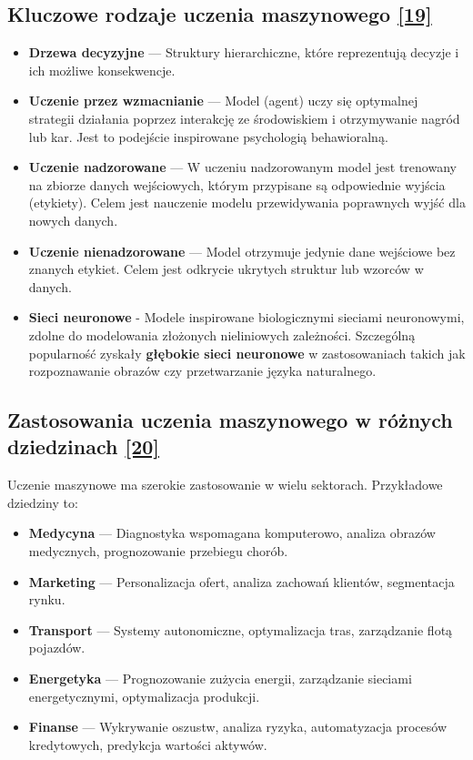 \documentclass[12pt,a4paper,twoside, inzynierska]{pwr_wmat_praca_dyplomowa}
\theoremstyle{plain}
\numberwithin{theorem}{chapter}
\theoremstyle{definition}
\numberwithin{theorem}{chapter}
\begin{document}
	\subsection{Kluczowe rodzaje uczenia maszynowego \hyperref[info19]{[19]}} 
	\begin{itemize} 
		\item \textbf{Drzewa decyzyjne} — Struktury hierarchiczne, które reprezentują decyzje i ich możliwe konsekwencje.
		\item \textbf{Uczenie przez wzmacnianie} — Model (agent) uczy się optymalnej strategii działania poprzez interakcję ze środowiskiem i otrzymywanie nagród lub kar. Jest to podejście inspirowane psychologią behawioralną.
		\item \textbf{Uczenie nadzorowane} — W uczeniu nadzorowanym model jest trenowany na zbiorze danych wejściowych, którym przypisane są odpowiednie wyjścia (etykiety). Celem jest nauczenie modelu przewidywania poprawnych wyjść dla nowych danych.
		\item \textbf{Uczenie nienadzorowane} — Model otrzymuje jedynie dane wejściowe bez znanych etykiet. Celem jest odkrycie ukrytych struktur lub wzorców w danych. 
		\item \textbf{Sieci neuronowe} - Modele inspirowane biologicznymi sieciami neuronowymi, zdolne do modelowania złożonych nieliniowych zależności. Szczególną popularność zyskały \textbf{głębokie sieci neuronowe} w zastosowaniach takich jak rozpoznawanie obrazów czy przetwarzanie języka naturalnego.
	\end{itemize}

	\subsection{Zastosowania uczenia maszynowego w różnych dziedzinach \hyperref[info20]{[20]} } 
	Uczenie maszynowe ma szerokie zastosowanie w wielu sektorach. Przykładowe dziedziny to:
	\begin{itemize}
		\item  \textbf{Medycyna} — Diagnostyka wspomagana komputerowo, analiza obrazów medycznych, prognozowanie przebiegu chorób.
		\item  \textbf{Marketing} —  Personalizacja ofert, analiza zachowań klientów, segmentacja rynku.
		\item  \textbf{Transport} — Systemy autonomiczne, optymalizacja tras, zarządzanie flotą pojazdów.
		\item  \textbf{Energetyka} — Prognozowanie zużycia energii, zarządzanie sieciami energetycznymi, optymalizacja produkcji.
		\item  \textbf{Finanse} — Wykrywanie oszustw, analiza ryzyka, automatyzacja procesów kredytowych, predykcja wartości aktywów.
	\end{itemize}
\end{document}
